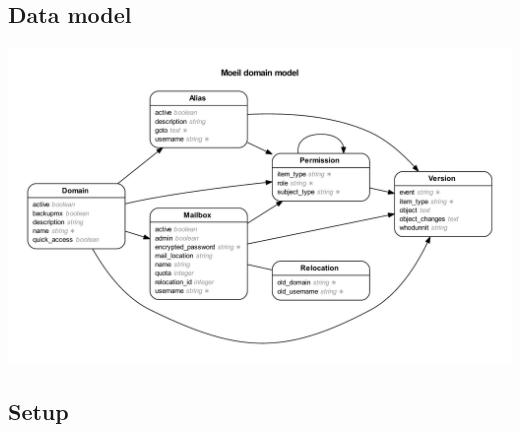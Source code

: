 \documentclass[12pt,a4paper]{scrartcl}
\begin{document}
		\subsection*{Data model}
			\includegraphics[width=\textwidth]{images/erd.pdf}

		\subsection*{Setup}

	\printbibliography
\end{document}
